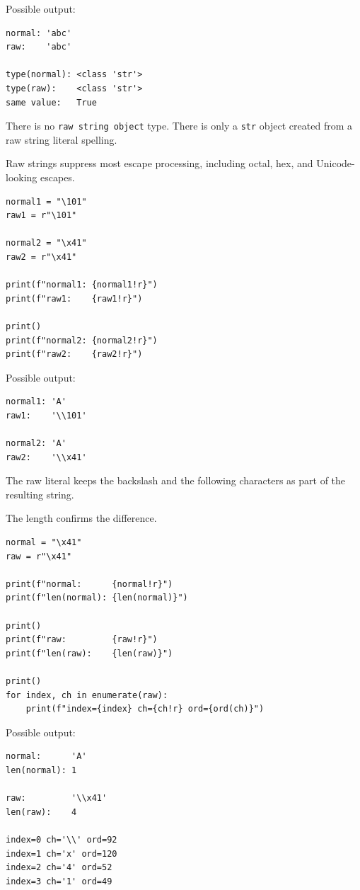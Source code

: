 Possible output:

\begin{verbatim}
normal: 'abc'
raw:    'abc'

type(normal): <class 'str'>
type(raw):    <class 'str'>
same value:   True
\end{verbatim}

There is no \texttt{raw string object} type. There is only a \texttt{str} object created from a raw string literal spelling.

Raw strings suppress most escape processing, including octal, hex, and Unicode-looking escapes.

\begin{verbatim}
normal1 = "\101"
raw1 = r"\101"

normal2 = "\x41"
raw2 = r"\x41"

print(f"normal1: {normal1!r}")
print(f"raw1:    {raw1!r}")

print()
print(f"normal2: {normal2!r}")
print(f"raw2:    {raw2!r}")
\end{verbatim}

Possible output:

\begin{verbatim}
normal1: 'A'
raw1:    '\\101'

normal2: 'A'
raw2:    '\\x41'
\end{verbatim}

The raw literal keeps the backslash and the following characters as part of the resulting string.

The length confirms the difference.

\begin{verbatim}
normal = "\x41"
raw = r"\x41"

print(f"normal:      {normal!r}")
print(f"len(normal): {len(normal)}")

print()
print(f"raw:         {raw!r}")
print(f"len(raw):    {len(raw)}")

print()
for index, ch in enumerate(raw):
    print(f"index={index} ch={ch!r} ord={ord(ch)}")
\end{verbatim}

Possible output:

\begin{verbatim}
normal:      'A'
len(normal): 1

raw:         '\\x41'
len(raw):    4

index=0 ch='\\' ord=92
index=1 ch='x' ord=120
index=2 ch='4' ord=52
index=3 ch='1' ord=49
\end{verbatim}

